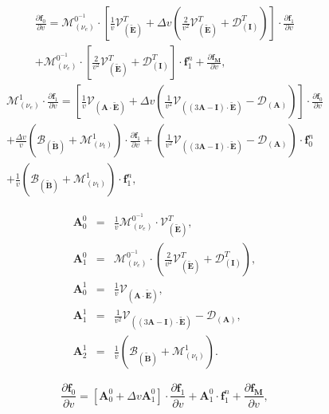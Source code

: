 \documentclass[preprint,12pt]{elsarticle}
\newcommand{\pdv}[2]{\frac{\partial{#1}}{\partial{#2}}}
\newcommand{\vect}[1]{\boldsymbol{#1}}
\newcommand{\matr}[1]{\mathbf{#1}}
\newcommand{\nue}{\nu_{e}}
\newcommand{\nutot}{\nu_{t}}
\newcommand{\vmag}{v}
\newcommand{\tE}{\vect{\tilde{E}}}
\newcommand{\tB}{\vect{\tilde{B}}}
\newcommand{\fM}{f_M}
\newcommand{\vfzero}{\vect{f}_0}
\newcommand{\fone}{\vect{f}_1}
\newcommand{\MI}{\matr{I}}
\newcommand{\MA}{\matr{A}}
\newcommand{\IM}{\boldsymbol{\mathcal{M}}}
\newcommand{\ID}{\boldsymbol{\mathcal{D}}}
\newcommand{\IV}{\boldsymbol{\mathcal{V}}}
\newcommand{\IB}{\boldsymbol{\mathcal{B}}}
\begin{document}
\begin{multline}
  \pdv{\vfzero}{\vmag}  
  = \IM^{0^{-1}}_{(\nue)}\cdot\left[ 
  \frac{1}{\vmag}\IV^T_{\left(\tE\right)} + 
  \Delta \vmag \left(
  \frac{2}{\vmag^2}\IV^T_{\left(\tE\right)} +  \ID^T_{\left(\MI\right)}
  \right) \right] \cdot \pdv{\fone}{\vmag} \\
  + \IM^{0^{-1}}_{(\nue)}\cdot\left[ 
  \frac{2}{\vmag^2}\IV^T_{\left(\tE\right)} +  \ID^T_{\left(\MI\right)} 
  \right] \cdot \fone^n + \pdv{\vect{\fM}}{\vmag} ,  
  \label{eq:semiM1hosf0}
\end{multline}
\begin{multline}
  \IM^1_{(\nue)} \cdot \pdv{\fone}{\vmag}  
  = \left[\frac{1}{\vmag}\IV_{\left(\MA \cdot \tE\right)} +
  \Delta\vmag
  \left(\frac{1}{\vmag^2}\IV_{\left(\left( 3\MA - \MI \right) \cdot \tE \right)}
  - \ID_{\left(\MA\right)}\right)\right]\cdot \pdv{\vfzero}{\vmag} \\
  + \frac{\Delta\vmag}{\vmag}\left(\IB_{\left( \tB \right)}
  + \IM^1_{\left( \nutot \right)}\right)\cdot \pdv{\fone}{\vmag}
  +
  \left(\frac{1}{\vmag^2}\IV_{\left(\left( 3\MA - \MI \right) \cdot \tE \right)}
  - \ID_{\left(\MA\right)}\right)\cdot \vfzero^n \\  
  + \frac{1}{\vmag}\left(\IB_{\left( \tB \right)} 
  + \IM^1_{\left( \nutot \right)}\right) 
  \cdot \fone^n ,
  \label{eq:semiM1hosf1}
\end{multline}

\begin{eqnarray}
  \matr{A}^0_0 &=& \frac{1}{\vmag}
  \IM^{0^{-1}}_{(\nue)}\cdot\IV^T_{\left(\tE\right)} , \\
  \matr{A}^0_1 &=& \IM^{0^{-1}}_{(\nue)}\cdot\left( 
  \frac{2}{\vmag^2}\IV^T_{\left(\tE\right)} +  \ID^T_{\left(\MI\right)} \right) 
  , \\
  \matr{A}^1_0 &=& \frac{1}{\vmag}\IV_{\left(\MA \cdot \tE\right)} , \\
  \matr{A}^1_1 &=& 
  \frac{1}{\vmag^2}\IV_{\left(\left( 3\MA - \MI \right) \cdot \tE \right)}
  - \ID_{\left(\MA\right)} , \\
  \matr{A}^1_2 &=& \frac{1}{\vmag}\left(\IB_{\left( \tB \right)} 
  + \IM^1_{\left( \nutot \right)}\right) .
\end{eqnarray}

\begin{equation}
  \pdv{\vfzero}{\vmag}  
  = \left[\matr{A}^0_0 + \Delta \vmag \matr{A}^0_1 \right] \cdot 
  \pdv{\fone}{\vmag} 
  + \matr{A}^0_1 \cdot \fone^n + \pdv{\vect{\fM}}{\vmag} ,  
  \label{eq:semiM1hosf0}
\end{equation}
\end{document}
